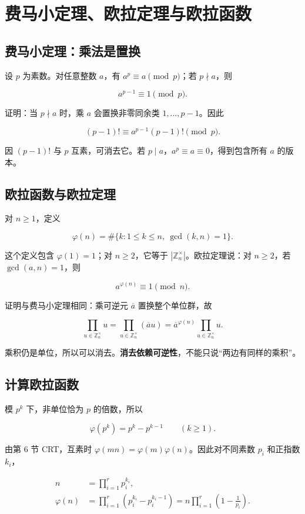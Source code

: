 \section{费马小定理、欧拉定理与欧拉函数}


\subsection{费马小定理：乘法是置换}


设 $p$ 为素数。对任意整数 $a$，有 $a^p\equiv a\pmod p$；若 $p\nmid a$，则

\[
a^{p-1}\equiv1\pmod p.
\]

证明：当 $p\nmid a$ 时，乘 $a$ 会置换非零同余类 $1,\ldots,p-1$。因此

\[
(p-1)!\equiv a^{p-1}(p-1)!\pmod p.
\]

因 $(p-1)!$ 与 $p$ 互素，可消去它。若 $p\mid a$，$a^p\equiv a\equiv0$，得到包含所有 $a$ 的版本。

\subsection{欧拉函数与欧拉定理}


对 $n\ge1$，定义

\[
\varphi(n)=\#\{k:1\le k\le n,\ \gcd(k,n)=1\}.
\]

这个定义包含 $\varphi(1)=1$；对 $n\ge2$，它等于 $|\mathbb Z_n^\times|$。欧拉定理说：对 $n\ge2$，若 $\gcd(a,n)=1$，则

\[
a^{\varphi(n)}\equiv1\pmod n.
\]

证明与费马小定理相同：乘可逆元 $\overline a$ 置换整个单位群，故

\[
\prod_{u\in\mathbb Z_n^\times}u
=\prod_{u\in\mathbb Z_n^\times}(\overline a u)
=\overline a^{\varphi(n)}\prod_{u\in\mathbb Z_n^\times}u.
\]

乘积仍是单位，所以可以消去。\textbf{消去依赖可逆性}，不能只说“两边有同样的乘积”。

\subsection{计算欧拉函数}


模 $p^k$ 下，非单位恰为 $p$ 的倍数，所以

\[
\varphi(p^k)=p^k-p^{k-1}\qquad(k\ge1).
\]

由第 6 节 CRT，互素时 $\varphi(mn)=\varphi(m)\varphi(n)$。因此对不同素数 $p_i$ 和正指数 $k_i$，

\[
\begin{aligned}
n&=\prod_{i=1}^r p_i^{k_i},\\
\varphi(n)&=\prod_{i=1}^r(p_i^{k_i}-p_i^{k_i-1})
=n\prod_{i=1}^r\left(1-\frac1{p_i}\right).
\end{aligned}
\]

